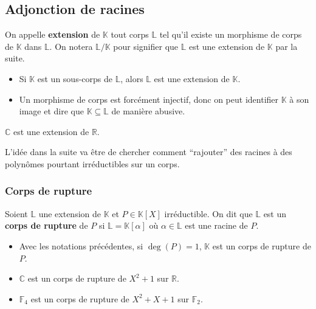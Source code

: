   \subsection{Adjonction de racines}
  \label{144-1}


  \begin{definition}
    On appelle \textbf{extension} de $\mathbb{K}$ tout corps $\mathbb{L}$ tel qu'il existe un morphisme de corps de $\mathbb{K}$ dans $\mathbb{L}$. On notera $\mathbb{L} / \mathbb{K}$ pour signifier que $\mathbb{L}$ est une extension de $\mathbb{K}$ par la suite.
  \end{definition}

  \begin{remark}
    \begin{itemize}
      \item Si $\mathbb{K}$ est un sous-corps de $\mathbb{L}$, alors $\mathbb{L}$ est une extension de $\mathbb{K}$.
      \item Un morphisme de corps est forcément injectif, donc on peut identifier $\mathbb{K}$ à son image et dire que $\mathbb{K} \subseteq \mathbb{L}$ de manière abusive.
    \end{itemize}
  \end{remark}

  \begin{example}
    $\mathbb{C}$ est une extension de $\mathbb{R}$.
  \end{example}

  L'idée dans la suite va être de chercher comment ``rajouter'' des racines à des polynômes pourtant irréductibles sur un corps.
  
  \subsubsection{Corps de rupture}


  \begin{definition}
    Soient $\mathbb{L}$ une extension de $\mathbb{K}$ et $P \in \mathbb{K}[X]$ irréductible. On dit que $\mathbb{L}$ est un \textbf{corps de rupture} de $P$ si $\mathbb{L} = \mathbb{K}[\alpha]$ où $\alpha \in \mathbb{L}$ est une racine de $P$.
  \end{definition}

  \begin{example}
    \begin{itemize}
      \item Avec les notations précédentes, si $\deg(P) = 1$, $\mathbb{K}$ est un corps de rupture de $P$.
      \item $\mathbb{C}$ est un corps de rupture de $X^2+1$ sur $\mathbb{R}$.
      \item $\mathbb{F}_4$ est un corps de rupture de $X^2+X+1$ sur $\mathbb{F}_2$.
    \end{itemize}
  \end{example}

